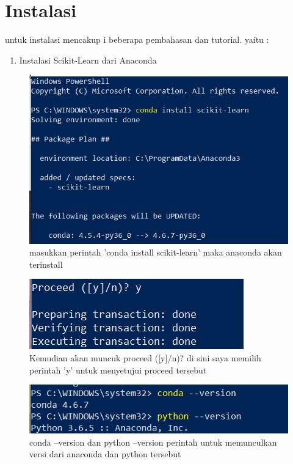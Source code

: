 

\section{Instalasi}
untuk instalasi mencakup i beberapa pembahasan dan tutorial. yaitu :
\begin{enumerate}
\item Instalasi Scikit-Learn dari Anaconda
\end{enumerate}

\begin{figure} [ht]
\centering
\includegraphics[scale=1] {figures/1.png}
\caption{masukkan perintah 'conda install scikit-learn' maka anaconda akan terinstall}
\label{proses instalasi}
\end{figure}


\begin{figure} [ht]
\centering
\includegraphics[scale=1] {figures/2.png}
\caption{Kemudian akan muncuk proceed ([y]/n)? di sini saya memilih perintah 'y' untuk menyetujui proceed tersebut}
\label{proses instalasi}
\end{figure}

\begin{figure} [ht]
\centering 
\includegraphics[scale=1] {figures/3.png}
\caption{conda --version dan python --version perintah untuk memunculkan versi dari anaconda dan python tersebut }
\label{proses instalasi}
\end{figure}

